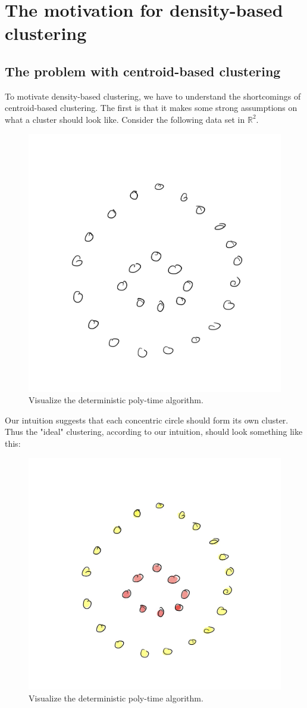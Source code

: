 \section{The motivation for density-based clustering}
  \subsection{The problem with centroid-based clustering}

To motivate density-based clustering, we have to understand the
shortcomings of centroid-based clustering. The first is that it makes
some strong assumptions on what a cluster should look like. Consider the following data set
in $\mathbb{R}^2$.

\begin{figure}[h]
\centering
\includegraphics[width=.7\linewidth]{chapter_2/files/raw.jpg}
\caption{Visualize the deterministic poly-time algorithm. }
\end{figure}

Our intuition suggests that each concentric circle should form its own cluster.
Thus the "ideal" clustering, according to our intuition, should look something
like this:

\begin{figure}[h]
\centering
\includegraphics[width=.7\linewidth]{chapter_2/files/intuition.jpg}
\caption{Visualize the deterministic poly-time algorithm. }
\end{figure}

